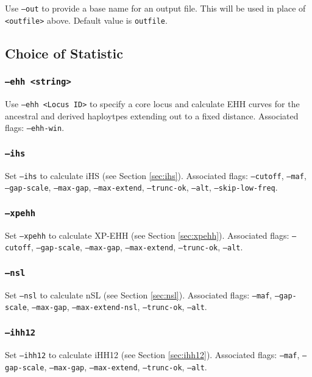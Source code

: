 \documentclass[12pt]{article}%
\begin{document}
Use {\tt --out} to provide a base name for an output file.  This will be used in place of {\tt <outfile>} above.  Default value is {\tt outfile}.  

\subsection{Choice of Statistic}

\subsubsection{{\tt --ehh <string>}}

Use {\tt --ehh <Locus ID>} to specify a core locus and calculate EHH curves for the ancestral and derived haploytpes extending out to a fixed distance.  Associated flags: {\tt --ehh-win}.

\subsubsection{{\tt --ihs}}

Set {\tt --ihs} to calculate iHS (see Section \ref{sec:ihs}).  Associated flags: {\tt --cutoff}, {\tt --maf}, {\tt --gap-scale}, {\tt --max-gap}, {\tt --max-extend}, {\tt --trunc-ok}, {\tt --alt}, {\tt --skip-low-freq}.

\subsubsection{{\tt --xpehh}}

Set {\tt --xpehh} to calculate XP-EHH (see Section \ref{sec:xpehh}).  Associated flags: {\tt --cutoff}, {\tt --gap-scale}, {\tt --max-gap}, {\tt --max-extend}, {\tt --trunc-ok}, {\tt --alt}.

\subsubsection{{\tt --nsl}}

Set {\tt --nsl} to calculate nSL (see Section \ref{sec:nsl}).  Associated flags: {\tt --maf}, {\tt --gap-scale}, {\tt --max-gap}, {\tt --max-extend-nsl}, {\tt --trunc-ok}, {\tt --alt}.

\subsubsection{{\tt --ihh12}}

Set {\tt --ihh12} to calculate iHH12 (see Section \ref{sec:ihh12}).  Associated flags: {\tt --maf}, {\tt --gap-scale}, {\tt --max-gap}, {\tt --max-extend}, {\tt --trunc-ok}, {\tt --alt}.
\end{document}
